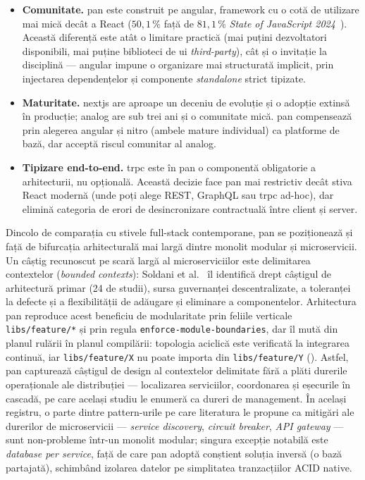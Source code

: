 \begin{itemize}
  \item \textbf{Comunitate.} \gls{pan} este construit pe \gls{angular}, framework cu o cotă de utilizare mai mică decât a React (\(50{,}1\,\%\) față de \(81{,}1\,\%\) \textit{State of JavaScript 2024}~\cite{stateOfJS2024}). Această diferență este atât o limitare practică (mai puțini dezvoltatori disponibili, mai puține biblioteci de \acrshort{ui} \textit{third-party}), cât și o invitație la disciplină --- \gls{angular} impune o organizare mai structurată implicit, prin injectarea dependențelor și componente \textit{standalone} strict tipizate.

  \item \textbf{Maturitate.} \gls{nextjs} are aproape un deceniu de evoluție și o adopție extinsă în producție; \gls{analog} are sub trei ani și o comunitate mică. \gls{pan} compensează prin alegerea \gls{angular} și \gls{nitro} (ambele mature individual) ca platforme de bază, dar acceptă riscul comunitar al \gls{analog}.

  \item \textbf{Tipizare end-to-end.} \gls{trpc} este în \gls{pan} o componentă obligatorie a arhitecturii, nu opțională. Această decizie face \gls{pan} mai restrictiv decât stiva React modernă (unde poți alege REST, GraphQL sau \gls{trpc} ad-hoc), dar elimină categoria de erori de desincronizare contractuală între client și server.
\end{itemize}

Dincolo de comparația cu stivele full-stack contemporane, \gls{pan} se poziționează și față de bifurcația arhitecturală mai largă dintre monolit modular și microservicii. Un câștig recunoscut pe scară largă al microserviciilor este delimitarea contextelor (\textit{bounded contexts}): Soldani et al.~\cite{soldani2018} îl identifică drept câștigul de arhitectură primar (24 de studii), sursa guvernanței descentralizate, a toleranței la defecte și a flexibilității de adăugare și eliminare a componentelor. Arhitectura \gls{pan} reproduce acest beneficiu de modularitate prin feliile verticale \texttt{libs/feature/*} și prin regula \texttt{enforce-module-boundaries}, dar îl mută din planul rulării în planul compilării: topologia aciclică este verificată la integrarea continuă, iar \texttt{libs/feature/X} nu poate importa din \texttt{libs/feature/Y} (). Astfel, \gls{pan} capturează câștigul de design al contextelor delimitate fără a plăti durerile operaționale ale distribuției --- localizarea serviciilor, coordonarea și eșecurile în cascadă, pe care același studiu le enumeră ca dureri de management. În același registru, o parte dintre pattern-urile pe care literatura le propune ca mitigări ale durerilor de microservicii --- \textit{service discovery}, \textit{circuit breaker}, \textit{API gateway} --- sunt non-probleme într-un monolit modular; singura excepție notabilă este \textit{database per service}, față de care \gls{pan} adoptă conștient soluția inversă (o bază partajată), schimbând izolarea datelor pe simplitatea tranzacțiilor ACID native.

